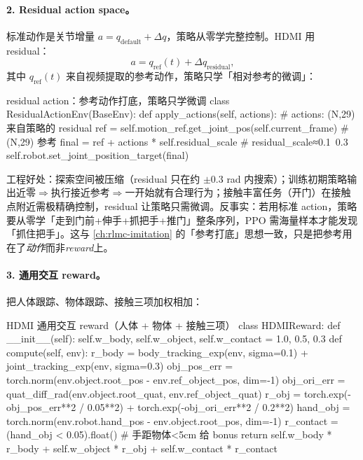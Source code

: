 \paragraph{2. Residual action space。}标准动作是关节增量 $a = q_{\text{default}} + \Delta q$，策略从零学完整控制。HDMI 用 residual：
\begin{equation}
a = q_{\text{ref}}(t) + \Delta q_{\text{residual}},
\label{eq:rlmc-mm-hdmi-residual}
\end{equation}
其中 $q_{\text{ref}}(t)$ 来自视频提取的参考动作，策略只学「相对参考的微调」：

\begin{codebox}[Python]{residual action：参考动作打底，策略只学微调}
class ResidualActionEnv(BaseEnv):
    def apply_actions(self, actions):       # actions: (N,29) 来自策略的 residual
        ref = self.motion_ref.get_joint_pos(self.current_frame)   # (N,29) 参考
        final = ref + actions * self.residual_scale   # residual_scale≈0.1~0.3
        self.robot.set_joint_position_target(final)
\end{codebox}

工程好处：探索空间被压缩（residual 只在约 $\pm0.3$ rad 内搜索）；训练初期策略输出近零$\Rightarrow$执行接近参考$\Rightarrow$一开始就有合理行为；接触丰富任务（开门）在接触点附近需极精确控制，residual 让策略只需微调。反事实：若用标准 action，策略要从零学「走到门前+伸手+抓把手+推门」整条序列，PPO 需海量样本才能发现「抓住把手」。这与 \cref{ch:rlmc-imitation} 的「参考打底」思想一致，只是把参考用在了\emph{动作}而非\emph{reward}上。

\paragraph{3. 通用交互 reward。}把人体跟踪、物体跟踪、接触三项加权相加：

\begin{codebox}[Python]{HDMI 通用交互 reward（人体 + 物体 + 接触三项）}
class HDMIReward:
    def __init__(self):
        self.w_body, self.w_object, self.w_contact = 1.0, 0.5, 0.3
    def compute(self, env):
        r_body = body_tracking_exp(env, sigma=0.1) + joint_tracking_exp(env, sigma=0.3)
        obj_pos_err = torch.norm(env.object.root_pos - env.ref_object_pos, dim=-1)
        obj_ori_err = quat_diff_rad(env.object.root_quat, env.ref_object_quat)
        r_obj = torch.exp(-obj_pos_err**2 / 0.05**2) + torch.exp(-obj_ori_err**2 / 0.2**2)
        hand_obj = torch.norm(env.robot.hand_pos - env.object.root_pos, dim=-1)
        r_contact = (hand_obj < 0.05).float()        # 手距物体<5cm 给 bonus
        return self.w_body * r_body + self.w_object * r_obj + self.w_contact * r_contact
\end{codebox}

